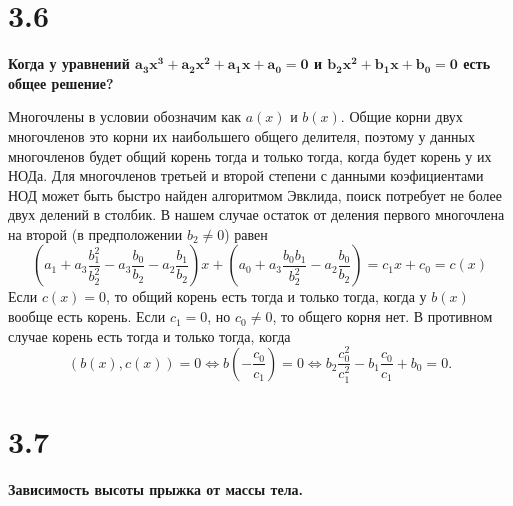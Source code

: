 \documentclass[a4paper,14pt]{article}
\begin{document}
\section*{3.6}

\begin{center}
	\LARGE{\textbf{Когда у уравнений $\bm{a_3x^3 + a_2x^2 + a_1x + a_0 = 0}$ и $\bm{b_2x^2 + b_1x + b_0 = 0}$ есть общее решение?}}\\
\end{center}

Многочлены в условии обозначим как $a(x)$ и $b(x)$.
Общие корни двух многочленов это корни их наибольшего общего делителя, поэтому у данных многочленов будет общий корень тогда и только тогда, когда будет корень у их НОДа. Для многочленов третьей и второй степени с данными коэфициентами НОД может быть быстро найден алгоритмом Эвклида, поиск потребует не более двух делений в столбик. В нашем случае остаток от деления первого многочлена на второй (в предположении $b_2\neq0$) равен 
$$
\left(a_1+a_3\frac{b_1^{2}}{b_2^{2}}-a_3\frac{b_0}{b_2}-a_2\frac{b_1}{b_2}\right) x + \left(a_0+a_3\frac{b_0 b_1}{b_2^{2}}-a_2\frac{b_0}{b_2}\right) = c_1 x + c_0 = c(x)
$$
Если $c(x) = 0$, то общий корень есть тогда и только тогда, когда у $b(x)$ вообще есть корень. Если $c_1 = 0$, но $c_0 \neq 0$, то общего корня нет. В противном случае корень есть тогда и только тогда, когда 
$$(b(x), c(x))=0\Leftrightarrow b\left(-\frac{c_0}{c_1}\right)=0\Leftrightarrow b_2\frac{c_0^{2}}{c_1^{2}}-b_1\frac{c_0}{c_1}+b_0=0.$$

\section*{3.7}

\begin{center}
	\LARGE{\textbf{Зависимость высоты прыжка от массы тела.}}\\
\end{center}
\end{document}
